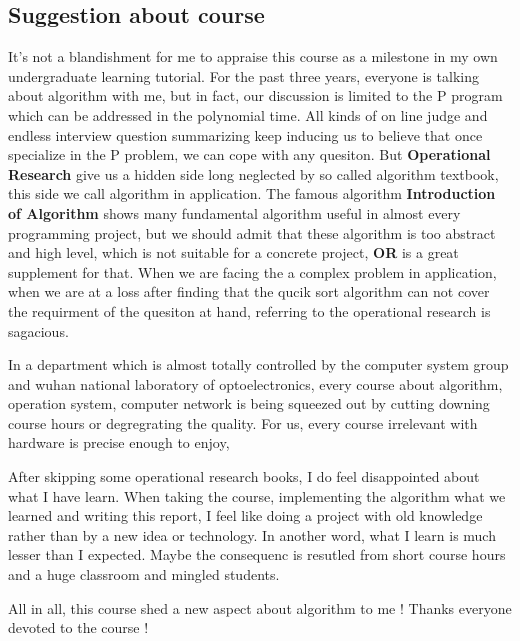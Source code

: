 \documentclass[10pt, a4paper, twocolumn]{article} %
\begin{document}
\subsection{Suggestion about course}
It's not a blandishment for me to appraise this course as a milestone in my
own undergraduate learning tutorial. For the past three years, everyone is
talking about algorithm with me, but in fact, our discussion is limited to the
P program which can be addressed in the polynomial time. All kinds of on line
judge and endless interview question summarizing keep inducing us to believe
that once specialize in the P problem, we can cope with any quesiton. But
\textbf{Operational Research} give us a hidden side long neglected by so called
algorithm textbook, this side we call algorithm in application. The famous
algorithm \textbf{Introduction of Algorithm} shows many fundamental algorithm
useful in almost every programming project, but we should admit that these
algorithm is too abstract and high level, which is not suitable for a
concrete project, \textbf{OR} is a great supplement for that. When we are facing
the a complex problem in application, when we are at a loss after finding that
the qucik sort algorithm can not cover the requirment of the quesiton at hand,
referring to the operational research is sagacious.

In a department which is almost totally controlled by the computer system group
and wuhan national laboratory of optoelectronics, every course about algorithm,
operation system, computer network is being squeezed out by cutting downing
course hours or degregrating the quality. For us, every course irrelevant with
hardware is precise enough to enjoy,

After skipping some operational research books, I do feel disappointed about
what I have learn. When taking the course, implementing the algorithm what we
learned  and writing this report, I feel like doing a project with old knowledge
rather than by a new idea or technology. In another word, what I learn is much
lesser than I expected. Maybe the consequenc is resutled from short course hours
and a huge classroom and mingled students.

All in all, this course shed a new aspect about algorithm to me ! Thanks
everyone devoted to the course !




\pagebreak
\printbibliography[title={Bibliography}] %

\newcommand\blankpage{%
    \null
    \thispagestyle{empty}%
    \addtocounter{page}{-1}%
    \newpage}
\end{document}
